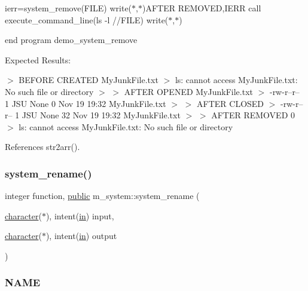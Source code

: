 ierr=system\+\_\+remove(\+F\+I\+L\+E) write($\ast$,$\ast$)\textquotesingle{}A\+F\+T\+ER R\+E\+M\+O\+V\+ED\textquotesingle{},I\+E\+RR call execute\+\_\+command\+\_\+line(\textquotesingle{}ls -\/l \textquotesingle{}//\+F\+I\+LE) write($\ast$,$\ast$)

end program demo\+\_\+system\+\_\+remove

Expected Results\+:

$>$ B\+E\+F\+O\+RE C\+R\+E\+A\+T\+ED My\+Junk\+File.\+txt $>$ ls\+: cannot access \textquotesingle{}My\+Junk\+File.\+txt\textquotesingle{}\+: No such file or directory $>$ $>$ A\+F\+T\+ER O\+P\+E\+N\+ED My\+Junk\+File.\+txt $>$ -\/rw-\/r--r-- 1 J\+SU None 0 Nov 19 19\+:32 My\+Junk\+File.\+txt $>$ $>$ A\+F\+T\+ER C\+L\+O\+S\+ED $>$ -\/rw-\/r--r-- 1 J\+SU None 32 Nov 19 19\+:32 My\+Junk\+File.\+txt $>$ $>$ A\+F\+T\+ER R\+E\+M\+O\+V\+ED 0 $>$ ls\+: cannot access \textquotesingle{}My\+Junk\+File.\+txt\textquotesingle{}\+: No such file or directory 

References str2arr().

\mbox{\label{namespacem__system_adfbaf3d17790da9ba0c520683d5b8003}} 
\subsubsection{\texorpdfstring{system\+\_\+rename()}{system\_rename()}}
{\footnotesize\ttfamily integer function, \hyperlink{M__stopwatch_83_8txt_a2f74811300c361e53b430611a7d1769f}{public} m\+\_\+system\+::system\+\_\+rename (\begin{DoxyParamCaption}\item[{\hyperlink{option__stopwatch_83_8txt_abd4b21fbbd175834027b5224bfe97e66}{character}($\ast$), intent(\hyperlink{M__journal_83_8txt_afce72651d1eed785a2132bee863b2f38}{in})}]{input,  }\item[{\hyperlink{option__stopwatch_83_8txt_abd4b21fbbd175834027b5224bfe97e66}{character}($\ast$), intent(\hyperlink{M__journal_83_8txt_afce72651d1eed785a2132bee863b2f38}{in})}]{output }\end{DoxyParamCaption})}



\subsubsection*{N\+A\+ME}

